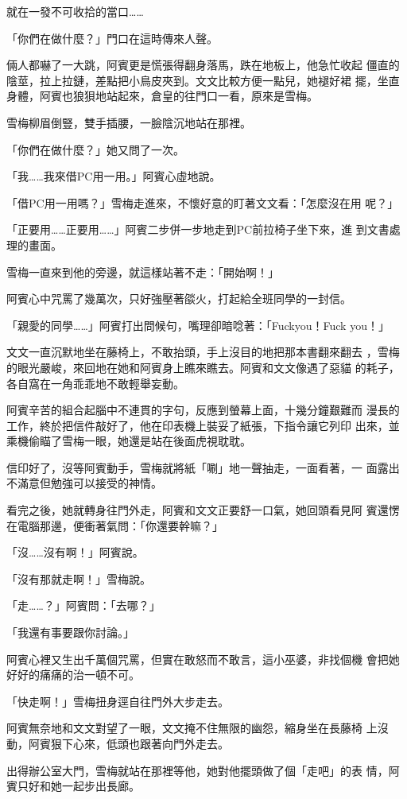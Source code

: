 就在一發不可收拾的當口……

「你們在做什麼？」門口在這時傳來人聲。

倆人都嚇了一大跳，阿賓更是慌張得翻身落馬，跌在地板上，他急忙收起
僵直的陰莖，拉上拉鏈，差點把小鳥皮夾到。文文比較方便一點兒，她褪好裙
擺，坐直身體，阿賓也狼狽地站起來，倉皇的往門口一看，原來是雪梅。

雪梅柳眉倒豎，雙手插腰，一臉陰沉地站在那裡。

「你們在做什麼？」她又問了一次。

「我……我來借PC用一用。」阿賓心虛地說。

「借PC用一用嗎？」雪梅走進來，不懷好意的盯著文文看：「怎麼沒在用
呢？」

「正要用……正要用……」阿賓二步併一步地走到PC前拉椅子坐下來，進
到文書處理的畫面。

雪梅一直來到他的旁邊，就這樣站著不走：「開始啊！」

阿賓心中咒罵了幾萬次，只好強壓著燄火，打起給全班同學的一封信。

「親愛的同學……」阿賓打出問候句，嘴理卻暗唸著：「Fuckyou！Fuck
you！」

文文一直沉默地坐在藤椅上，不敢抬頭，手上沒目的地把那本書翻來翻去
，雪梅的眼光嚴峻，來回地在她和阿賓身上瞧來瞧去。阿賓和文文像遇了惡貓
的耗子，各自窩在一角乖乖地不敢輕舉妄動。

阿賓辛苦的組合起腦中不連貫的字句，反應到螢幕上面，十幾分鐘艱難而
漫長的工作，終於把信件敲好了，他在印表機上裝妥了紙張，下指令讓它列印
出來，並乘機偷瞄了雪梅一眼，她還是站在後面虎視耽耽。

信印好了，沒等阿賓動手，雪梅就將紙「唰」地一聲抽走，一面看著，一
面露出不滿意但勉強可以接受的神情。

看完之後，她就轉身往門外走，阿賓和文文正要舒一口氣，她回頭看見阿
賓還愣在電腦那邊，便衝著氣問：「你還要幹嘛？」

「沒……沒有啊！」阿賓說。

「沒有那就走啊！」雪梅說。

「走……？」阿賓問：「去哪？」

「我還有事要跟你討論。」

阿賓心裡又生出千萬個咒罵，但實在敢怒而不敢言，這小巫婆，非找個機
會把她好好的痛痛的治一頓不可。

「快走啊！」雪梅扭身逕自往門外大步走去。

阿賓無奈地和文文對望了一眼，文文掩不住無限的幽怨，縮身坐在長藤椅
上沒動，阿賓狠下心來，低頭也跟著向門外走去。

出得辦公室大門，雪梅就站在那裡等他，她對他擺頭做了個「走吧」的表
情，阿賓只好和她一起步出長廊。

